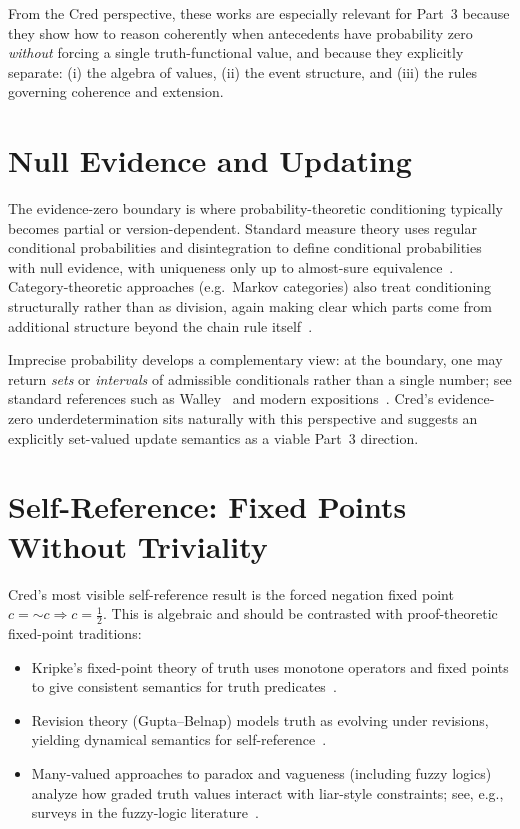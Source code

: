 \documentclass[11pt,a4paper]{article}
\newcommand{\negc}{\mathord{\sim}}
\begin{document}
From the Cred perspective, these works are especially relevant for Part~3
because they show how to reason coherently when antecedents have probability
zero \emph{without} forcing a single truth-functional value, and because they
explicitly separate: (i) the algebra of values, (ii) the event structure, and
(iii) the rules governing coherence and extension.

\section{Null Evidence and Updating}

The evidence-zero boundary is where probability-theoretic conditioning
typically becomes partial or version-dependent.  Standard measure theory uses
regular conditional probabilities and disintegration to define conditional
probabilities with null evidence, with uniqueness only up to almost-sure
equivalence~\cite{chang1997}.  Category-theoretic approaches (e.g.\ Markov
categories) also treat conditioning structurally rather than as division, again
making clear which parts come from additional structure beyond the chain rule
itself~\cite{fritz2020}.

Imprecise probability develops a complementary view: at the boundary, one may
return \emph{sets} or \emph{intervals} of admissible conditionals rather than
a single number; see standard references such as Walley~\cite{walley1991} and
modern expositions~\cite{troffaes2014}.
Cred's evidence-zero underdetermination sits naturally with this perspective and
suggests an explicitly set-valued update semantics as a viable Part~3 direction.

\section{Self-Reference: Fixed Points Without Triviality}

Cred's most visible self-reference result is the forced negation fixed point
$c=\negc c \Rightarrow c=\tfrac12$.  This is algebraic and should be contrasted
with proof-theoretic fixed-point traditions:
\begin{itemize}[nosep]
\item Kripke's fixed-point theory of truth uses monotone operators and fixed
points to give consistent semantics for truth predicates~\cite{kripke1975}.
\item Revision theory (Gupta--Belnap) models truth as evolving under revisions,
yielding dynamical semantics for self-reference~\cite{gupta1993}.
\item Many-valued approaches to paradox and vagueness (including fuzzy logics)
analyze how graded truth values interact with liar-style constraints; see, e.g.,
surveys in the fuzzy-logic literature~\cite{bergmann2008}.
\end{itemize}
\end{document}

